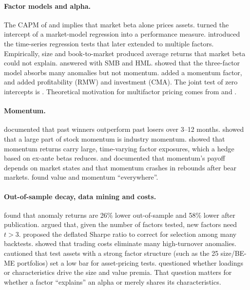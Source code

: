 \documentclass[11pt]{article}
\begin{document}
\paragraph{Factor models and alpha.} The CAPM of \citet{Sharpe1964} and \citet{Lintner1965} implies that market beta alone prices assets. \citet{Jensen1968} turned the intercept of a market-model regression into a performance measure. \citet{BJS1972} introduced the time-series regression tests that \citet{FF1993} later extended to multiple factors. Empirically, size \citep{Banz1981} and book-to-market \citep{RRL1985,FF1992} produced average returns that market beta could not explain. \citet{FF1993} answered with SMB and HML. \citet{FF1996} showed that the three-factor model absorbs many anomalies but not momentum. \citet{Carhart1997} added a momentum factor, and \citet{FF2015} added profitability (RMW) and investment (CMA). The joint test of zero intercepts is \citet{GRS1989}. Theoretical motivation for multifactor pricing comes from \citet{Merton1973} and \citet{Ross1976}.

\paragraph{Momentum.} \citet{JT1993} documented that past winners outperform past losers over 3--12 months. \citet{MG1999} showed that a large part of stock momentum is industry momentum. \citet{GM2001} showed that momentum returns carry large, time-varying factor exposures, which a hedge based on ex-ante betas reduces. \citet{CGH2004} and \citet{DM2016} documented that momentum's payoff depends on market states and that momentum crashes in rebounds after bear markets. \citet{AMP2013} found value and momentum ``everywhere''.

\paragraph{Out-of-sample decay, data mining and costs.} \citet{MP2016} found that anomaly returns are 26\% lower out-of-sample and 58\% lower after publication. \citet{HLZ2016} argued that, given the number of factors tested, new factors need $t>3$. \citet{BLdP2014} proposed the deflated Sharpe ratio to correct for selection among many backtests. \citet{NMV2016} showed that trading costs eliminate many high-turnover anomalies. \citet{LNS2010} cautioned that test assets with a strong factor structure (such as the 25 size/BE-ME portfolios) set a low bar for asset-pricing tests. \citet{DT1997} questioned whether loadings or characteristics drive the size and value premia. That question matters for whether a factor ``explains'' an alpha or merely shares its characteristics.
\end{document}
